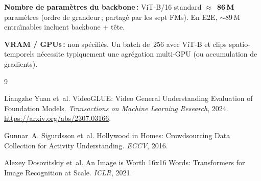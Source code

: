 \documentclass[11pt,a4paper]{article}
\begin{document}
\noindent
\textbf{Nombre de param\`etres du backbone\,:} ViT-B/16 standard
$\approx$~\textbf{86\,M} param\`etres (ordre de grandeur\,; partag\'e par
les sept FMs). En E2E, $\sim$89\,M entra\^{\i}nables incluent backbone + t\^{e}te.

\noindent
\textbf{VRAM / GPUs\,:} non sp\'ecifi\'es. Un batch de~256 avec ViT-B et
clips spatio-temporels n\'ecessite typiquement une agr\'egation multi-GPU
(ou accumulation de gradients).

\begin{thebibliography}{9}

Liangzhe Yuan et~al.
\newblock VideoGLUE: Video General Understanding Evaluation of Foundation Models.
\newblock \emph{Transactions on Machine Learning Research}, 2024.
\newblock \url{https://arxiv.org/abs/2307.03166}.

Gunnar~A. Sigurdsson et~al.
\newblock Hollywood in Homes: Crowdsourcing Data Collection for Activity Understanding.
\newblock \emph{ECCV}, 2016.

Alexey Dosovitskiy et~al.
\newblock An Image is Worth 16x16 Words: Transformers for Image Recognition at Scale.
\newblock \emph{ICLR}, 2021.

\end{thebibliography}
\end{document}

